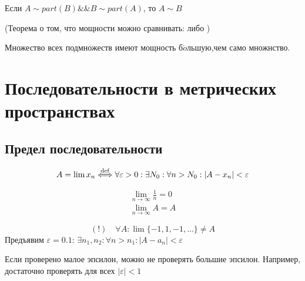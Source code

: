 \documentclass[12pt, a4paper]{article}
\begin{document}
  \begin{theorem}
  Если $A \sim part(B) \&\& B \sim part(A)$, то $A \sim B$

  (Теорема о том, что мощности можно сравнивать: либо )
  \end{theorem}

  \begin{statement}
  Множество всех подмножеств имеют мощность б$\acute{o}$льшую,чем само множнство.
  \end{statement}

  \section{Последовательности в метрических пространствах}

  \subsection{Предел последовательности}

  \begin{definition}
  \begin{equation}
    A = \lim{x_n} \overset{\mathrm{def}}{\Longleftrightarrow} \forall \varepsilon > 0: \exists N_0: \forall n > N_0: |A - x_n| < \varepsilon
  \end{equation}     
  \end{definition}

  \begin{definition}
  \end{definition}

  \begin{example}
  \begin{gather}
    \lim_{n \to \infty}{\frac{1}{n}} = 0 \\
    \lim_{n \to \infty}{A} = A
  \end{gather}
  \end{example}

  \begin{example}
  \begin{equation}
    (!) \quad \forall A: \lim{\{-1, 1, -1, \ldots\}} \neq A
  \end{equation}
  Предъявим $\varepsilon = 0.1$: $\exists n_1, n_2: \forall n > n_1: |A - a_{n}| < \varepsilon$
  \end{example}

  \begin{note}
  Если проверено малое эпсилон, можно не проверять большие эпсилон. Например, достаточно проверять для всех $|\varepsilon| < 1$ 
  \end{note}
\end{document}
